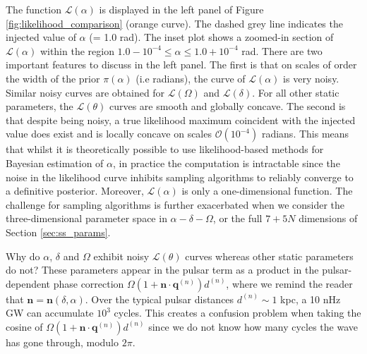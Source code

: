 \documentclass[fleqn,usenatbib,useAMS]{mnras}
\begin{document}
The function $\mathcal{L}(\alpha)$ is displayed in the left panel of Figure \ref{fig:likelihood_comparison} (orange curve). The dashed grey line indicates the injected value of $\alpha$ (= 1.0 rad). The inset plot shows a zoomed-in section of $\mathcal{L}(\alpha)$ within the region $ 1.0 - 10^{-4} \le \alpha \le 1.0 +10^{-4}$ rad.  There are two important features to discuss in the left panel. The first is that on scales of order the width of the prior $\pi(\alpha)$ (i.e radians), the curve of $\mathcal{L}(\alpha)$ is very noisy. Similar noisy curves are obtained for $\mathcal{L}(\Omega)$ and $\mathcal{L}(\delta)$. For all other static parameters, the $\mathcal{L}(\theta)$ curves are smooth and globally concave. The second is that despite being noisy, a true likelihood maximum coincident with the injected value does exist and is locally concave on scales $\mathcal{O} \left( 10^{-4}\right)$ radians. This means that whilst it is theoretically possible to use likelihood-based methods for Bayesian estimation of $\alpha$, in practice the computation is intractable since the noise in the likelihood curve inhibits sampling algorithms to reliably converge to a definitive posterior. Moreover, $\mathcal{L}(\alpha)$ is only a one-dimensional function. The challenge for sampling algorithms is further exacerbated when we consider the three-dimensional parameter space in $\alpha - \delta - \Omega$, or the full $7 + 5N$ dimensions of Section \ref{sec:ss_params}. \newline 

Why do $\alpha$, $\delta$ and $\Omega$ exhibit noisy $\mathcal{L}(\theta)$ curves whereas other static parameters do not? These parameters appear in the pulsar term as a product in the pulsar-dependent phase correction $\Omega \left(1 + \boldsymbol{n}\cdot \boldsymbol{q}^{(n)} \right)  d^{(n)}$, where we remind the reader that $\boldsymbol{n} = \boldsymbol{n}(\delta, \alpha)$. Over the typical pulsar distances $d^{(n)} \sim 1$ kpc, a 10 nHz GW can accumulate $10^3$ cycles. This creates a confusion problem when taking the cosine of  $\Omega \left(1 + \boldsymbol{n}\cdot \boldsymbol{q}^{(n)} \right)  d^{(n)}$ since we do not know how many cycles the wave has gone through, modulo $2 \pi$. \newline 
\end{document}
